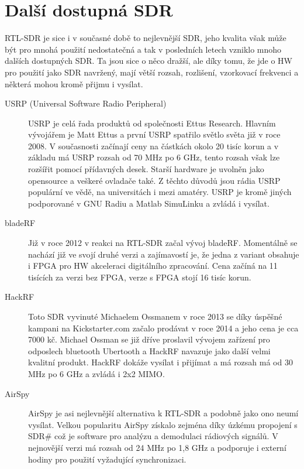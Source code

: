 \documentclass{ctuthesis}
\begin{document}
\section{Další dostupná SDR}
RTL-SDR je sice i v současné době to nejlevnější SDR, jeho kvalita však může být pro mnohá použití nedostatečná a tak v posledních letech vzniklo mnoho dalších dostupných SDR. Ta jsou sice o něco dražší, ale díky tomu, že jde o HW pro použití jako SDR navržený, mají větší rozsah, rozlišení, vzorkovací frekvenci a některá mohou kromě přijmu i vysílat.
\begin{description}
\item[USRP (Universal Software Radio Peripheral)]
USRP je celá řada produktů od společnosti Ettus Research. Hlavním vývojářem je Matt Ettus a první USRP spatřilo světlo světa již v roce 2008. V současnosti začínají ceny na částkách okolo 20 tisíc korun a v základu má USRP rozsah od 70 MHz po 6 GHz, tento rozsah však lze rozšířit pomocí přídavných desek. Starší hardware je uvolněn jako opensource a veškeré ovladače také. Z těchto důvodů jsou rádia USRP populární ve vědě, na universitách i mezi amatéry. USRP je kromě jiných podporované v GNU Radiu a Matlab SimuLinku a zvládá i vysílat. \cite{etusresearch}
\item[bladeRF]
Již v roce 2012 v reakci na RTL-SDR začal vývoj bladeRF. Momentálně se nachází již ve svojí druhé verzi a zajímavostí je, že jedna z variant obsahuje i FPGA pro HW akceleraci digitálního zpracování. Cena začíná na 11 tisících za verzi bez FPGA, verze s FPGA stojí 16 tisíc korun. \cite{nuand}
\item[HackRF]
Toto SDR vyvinuté Michaelem Ossmanem v roce 2013 se díky úspěšné kampani na Kickstarter.com  začalo prodávat v roce 2014 a jeho cena je cca 7000 kč. Michael Ossman se již dříve proslavil vývojem zařízení pro odposlech bluetooth Ubertooth a HackRF navazuje jako další velmi kvalitní produkt. HackRF dokáže vysílat i přijímat a má rozsah má od 30 MHz po 6 GHz a zvládá i 2x2 MIMO. \cite{hackrf}
\item[AirSpy]
AirSpy je asi nejlevnější alternativa k RTL-SDR a podobně jako ono neumí vysílat. Velkou popularitu AirSpy získalo zejména díky úzkému propojení s SDR\#  což je software pro analýzu a demodulaci rádiových signálů. V nejnovější verzi má rozsah od 24 MHz po 1,8 GHz a podporuje i externí hodiny pro použití vyžadující synchronizaci.
\cite{airspy}
\end{description}
\end{document}
